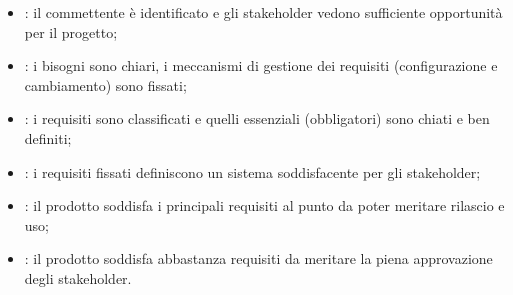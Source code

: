 \begin{itemize}
  \item {}: il commettente è identificato e gli
    stakeholder vedono sufficiente opportunità per il progetto;
  \item {}: i bisogni sono chiari, i meccanismi di
    gestione dei requisiti (configurazione e cambiamento) sono
    fissati;
  \item {}: i requisiti sono classificati e quelli
    essenziali (obbligatori) sono chiati e ben definiti;
  \item {}: i requisiti fissati definiscono un
    sistema soddisfacente per gli stakeholder;
  \item {}: il prodotto soddisfa i principali
    requisiti al punto da poter meritare rilascio e uso;
  \item {}: il prodotto soddisfa abbastanza requisiti
    da meritare la piena approvazione degli stakeholder.
\end{itemize}
